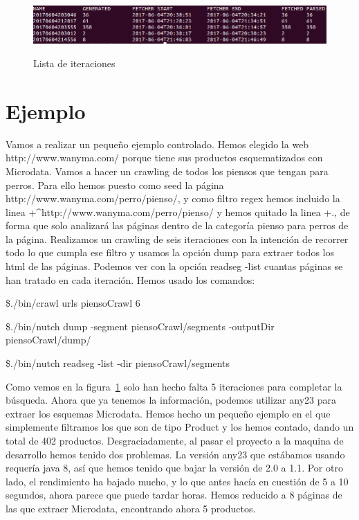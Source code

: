 \documentclass[a4paper]{article}
\begin{document}
\begin{figure}[h]
\caption{Lista de iteraciones}
\includegraphics[width=\linewidth]{lista}
\label{fig:lista}
\end{figure}

\section{Ejemplo}

Vamos a realizar un pequeño ejemplo controlado. Hemos elegido la web http://www.wanyma.com/ porque tiene sus productos esquematizados con Microdata. Vamos a hacer un crawling de todos los piensos que tengan para perros. Para ello hemos puesto como seed la página http://www.wanyma.com/perro\slash pienso/, y como filtro regex hemos incluido la linea +\^{}http://www.wanyma.com\slash perro/pienso/ y hemos quitado la linea +., de forma que solo analizará las páginas dentro de la categoría pienso para perros de la página. Realizamos un crawling de seis iteraciones con la intención de recorrer todo lo que cumpla ese filtro y usamos la opción dump para extraer todos los html de las páginas. Podemos ver con la opción readseg -list cuantas páginas se han tratado en cada iteración. Hemos usado los comandos:

\$./bin/crawl urls piensoCrawl 6

\$./bin/nutch dump -segment piensoCrawl/segments -outputDir piensoCrawl\slash dump/

\$./bin/nutch readseg -list -dir piensoCrawl/segments


Como vemos en la figura~\ref{fig:lista} solo han hecho falta 5 iteraciones para completar la búsqueda. Ahora que ya tenemos la información, podemos utilizar any23 para extraer los esquemas Microdata. Hemos hecho un pequeño ejemplo en el que simplemente filtramos los que son de tipo Product y los hemos contado, dando un total de 402 productos. Desgraciadamente, al pasar el proyecto a la maquina de desarrollo hemos tenido dos problemas. La versión any23 que estábamos usando requería java 8, así que hemos tenido que bajar la versión de 2.0 a 1.1. Por otro lado, el rendimiento ha bajado mucho, y lo que antes hacía en cuestión de 5 a 10 segundos, ahora parece que puede tardar horas. Hemos reducido a 8 páginas de las que extraer Microdata, encontrando ahora 5 productos.
\end{document}
